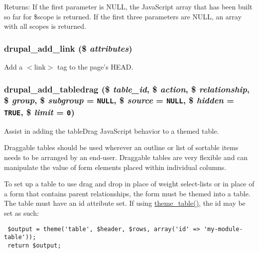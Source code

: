 \begin{Desc}
\item[Returns:]If the first parameter is NULL, the JavaScript array that has been built so far for \$scope is returned. If the first three parameters are NULL, an array with all scopes is returned. \end{Desc}
\hypertarget{common_8inc_7eda2691396ef26c49e05d37a43bddfd}{
\subsubsection[{drupal\_\-add\_\-link}]{\setlength{\rightskip}{0pt plus 5cm}drupal\_\-add\_\-link (\$ {\em attributes})}}
\label{common_8inc_7eda2691396ef26c49e05d37a43bddfd}


Add a $<$link$>$ tag to the page's HEAD. \hypertarget{common_8inc_b905af5d90a84b5d48f3a517992875f5}{
\subsubsection[{drupal\_\-add\_\-tabledrag}]{\setlength{\rightskip}{0pt plus 5cm}drupal\_\-add\_\-tabledrag (\$ {\em table\_\-id}, \/  \$ {\em action}, \/  \$ {\em relationship}, \/  \$ {\em group}, \/  \$ {\em subgroup} = {\tt NULL}, \/  \$ {\em source} = {\tt NULL}, \/  \$ {\em hidden} = {\tt TRUE}, \/  \$ {\em limit} = {\tt 0})}}
\label{common_8inc_b905af5d90a84b5d48f3a517992875f5}


Assist in adding the tableDrag JavaScript behavior to a themed table.

Draggable tables should be used wherever an outline or list of sortable items needs to be arranged by an end-user. Draggable tables are very flexible and can manipulate the value of form elements placed within individual columns.

To set up a table to use drag and drop in place of weight select-lists or in place of a form that contains parent relationships, the form must be themed into a table. The table must have an id attribute set. If using \hyperlink{group__themeable_g77f053aaa73bbeaa3943bf8f06ce625d}{theme\_\-table()}, the id may be set as such: 

\begin{Code}\begin{verbatim} $output = theme('table', $header, $rows, array('id' => 'my-module-table'));
 return $output;
\end{verbatim}
\end{Code}



